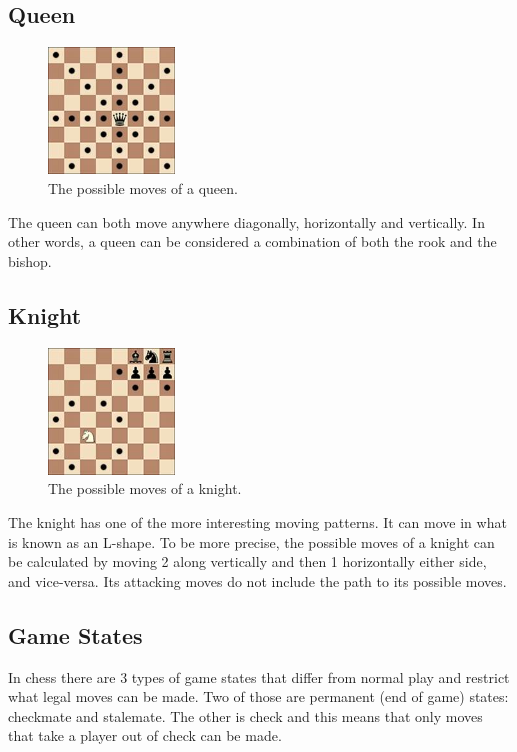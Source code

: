 \documentclass[twoside, 12pt]{report}
\begin{document}
\subsection{Queen}
\begin{figure}[H]
\centering
	\includegraphics[width=0.3\textwidth]{images/boards/queen_movement}
	\caption{The possible moves of a queen.}
\end{figure}
The queen can both move anywhere diagonally, horizontally and vertically. In other words, a queen can be considered a combination of both the rook and the bishop.
\subsection{Knight}
\begin{figure}[H]
\centering
	\includegraphics[width=0.3\textwidth]{images/boards/knight_movement}
	\caption{The possible moves of a knight.}
\end{figure}
The knight has one of the more interesting moving patterns. It can move in what is known as an L-shape. To be more precise, the possible moves of a knight can be calculated by moving 2 along vertically and then 1 horizontally either side, and vice-versa. Its attacking moves do not include the path to its possible moves.
\subsection{Game States}
In chess there are 3 types of game states that differ from normal play and restrict what legal moves can be made. Two of those are permanent (end of game) states: checkmate and stalemate. The other is check and this means that only moves that take a player out of check can be made. 
\end{document}
